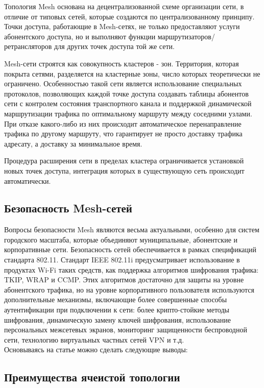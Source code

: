 \documentclass[a4paper]{article}
\begin{document}
Топология Mesh основана на децентрализованной схеме организации сети, в отличие от типовых сетей, которые создаются по централизованному принципу.
 Точки доступа, работающие в Mesh-сетях, не только предоставляют услуги абонентского доступа, но и выполняют функции маршрутизаторов/ретрансляторов для других точек доступа той же сети. 

Mesh-сети строятся как совокупность кластеров - зон. Территория, которая покрыта сетями, разделяется на кластерные зоны, число которых теоретически не ограничено. 
Особенностью такой сети является использование специальных протоколов, позволяющих каждой точке доступа создавать таблицы абонентов сети с контролем состояния транспортного канала и поддержкой динамической маршрутизации трафика по оптимальному маршруту между соседними узлами. 
При отказе какого-либо из них происходит автоматическое перенаправление трафика по другому маршруту, что гарантирует не просто доставку трафика адресату, а доставку за минимальное время.

Процедура расширения сети в пределах кластера ограничивается установкой новых точек доступа, интеграция которых в существующую сеть происходит автоматически.

\subsection{Безопасность Mesh-сетей}

Вопросы безопасности Mesh  являются весьма актуальными, особенно для систем городского масштаба, которые объединяют муниципальные, абонентские и корпоративные сети. 
Безопасность сетей обеспечивается в рамках спецификаций стандарта 802.11. Стандарт IEEE 802.11i предусматривает использование в продуктах Wi-Fi таких средств, как поддержка алгоритмов шифрования трафика: TKIP, WRAP и CCMP.
 Этих алгоритмов достаточно для защиты на уровне абонентского трафика, но на уровне корпоративного пользователя используются дополнительные механизмы, включающие более совершенные способы аутентификации при подключении к сети: более крипто-стойкие методы шифрования, динамическую замену ключей шифрования, использование персональных межсетевых экранов, мониторинг защищенности беспроводной сети, технологию виртуальных частных сетей VPN и т.д.
\\

 Основываясь на статье \cite{litlink2} можно сделать следующие выводы:
 \subsection[]{Преимущества ячеистой топологии}
\end{document}

